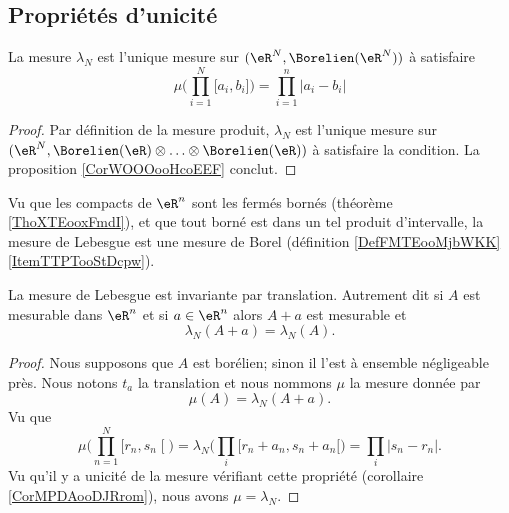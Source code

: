 \subsection{Propriétés d'unicité}

\begin{corollary}       \label{CorMPDAooDJRrom}
    La mesure \( \lambda_N\) est l'unique mesure sur \(   (\eR^N,  \Borelien(\eR^N) )   \) à satisfaire 
    \begin{equation}
        \mu\big( \prod_{i=1}^N\mathopen[ a_i , b_i \mathclose] \big)=\prod_{i=1}^n| a_i-b_i |
    \end{equation}
\end{corollary}

\begin{proof}
    Par définition de la mesure produit, \( \lambda_N\) est l'unique mesure sur \(   (\eR^N,  \Borelien(\eR)\otimes\ldots\otimes\Borelien(\eR) )   \) à satisfaire la condition. La proposition \ref{CorWOOOooHcoEEF} conclut.
\end{proof}

Vu que les compacts de \( \eR^n\) sont les fermés bornés (théorème \ref{ThoXTEooxFmdI}), et que tout borné est dans un tel produit d'intervalle, la mesure de Lebesgue est une mesure de Borel (définition \ref{DefFMTEooMjbWKK}\ref{ItemTTPTooStDcpw}).

\begin{theorem}
    La mesure de Lebesgue est invariante par translation. Autrement dit si \( A\) est mesurable dans \( \eR^n\) et si \( a\in \eR^n\) alors \( A+a\) est mesurable et
    \begin{equation}
        \lambda_N(A+a)=\lambda_N(A).
    \end{equation}
\end{theorem}


\begin{proof}
    Nous supposons que \( A\) est borélien; sinon il l'est à ensemble négligeable près. Nous notons \( t_a\) la translation et nous nommons \( \mu\) la mesure donnée par
    \begin{equation}
        \mu(A)=\lambda_N(A+a).
    \end{equation}
    Vu que
    \begin{equation}
        \mu\big( \prod_{n=1}^N\mathopen[ r_n , s_n \mathclose[ \big)=\lambda_N\big( \prod_i\mathopen[ r_n+a_n , s_n+a_n [ \big)=\prod_i| s_n-r_n |.
    \end{equation}
    Vu qu'il y a unicité de la mesure vérifiant cette propriété (corollaire \ref{CorMPDAooDJRrom}), nous avons \( \mu=\lambda_N\).
\end{proof}

